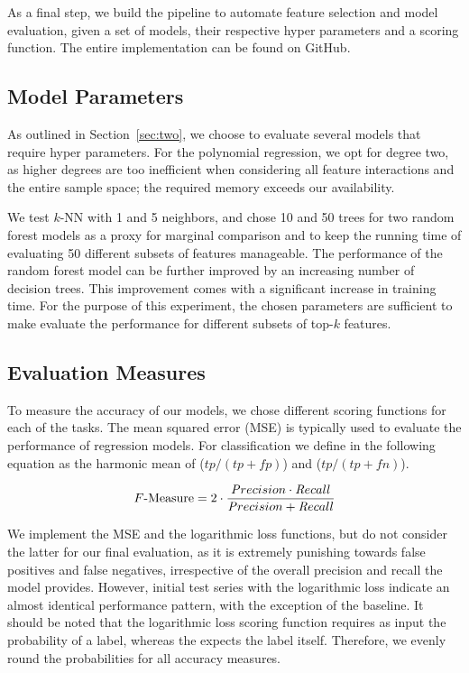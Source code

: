 As a final step, we build the pipeline to automate feature selection and model
evaluation, given a set of models, their respective hyper parameters and a
scoring function.  The entire implementation can be found on
GitHub.

\subsection{Model Parameters}

As outlined in Section~\ref{sec:two}, we choose to evaluate several models that
require hyper parameters.  For the polynomial regression, we opt for degree two,
as higher degrees are too inefficient when considering all feature interactions
and the entire sample space; the required memory exceeds our availability.

We test $k$-NN with 1 and 5 neighbors, and chose 10 and 50 trees for two random
forest models as a proxy for marginal comparison and to keep the running time of
evaluating 50 different subsets of features manageable.  The performance of the
random forest model can be further improved by an increasing number of decision
trees.  This improvement comes with a significant increase in training time.
For the purpose of this experiment, the chosen parameters are sufficient to make
evaluate the performance for different subsets of top-$k$ features.

\subsection{Evaluation Measures}

To measure the accuracy of our models, we chose different scoring functions for
each of the tasks.  The mean squared error (MSE) is typically used to evaluate
the performance of regression models.  For classification we define \fmeasure{}
in the following equation as the harmonic mean of \precision{}
($tp / (tp + fp)$) and \recall{} ($tp / (tp + fn)$).

\vspace{-1em}
\begin{equation}\label{eq:fmeasure}
  \text{\ensuremath{F}-Measure} = 2 \cdot \frac{{\mathop{\mathit Precision}} \cdot {\mathop{\mathit Recall}}} {{\mathop{\mathit Precision}} +
    {\mathop{\mathit Recall}}}
\end{equation}

We implement the MSE and the logarithmic
loss functions, but do not
consider the latter for our final evaluation, as it is extremely punishing
towards false positives and false negatives, irrespective of the overall
precision and recall the model provides.  However, initial test series with the
logarithmic loss indicate an almost identical performance pattern, with the
exception of the baseline.  It should be noted that the logarithmic loss scoring
function requires as input the probability of a label, whereas the \fmeasure{}
expects the label itself.  Therefore, we evenly round the probabilities for all
accuracy measures.

